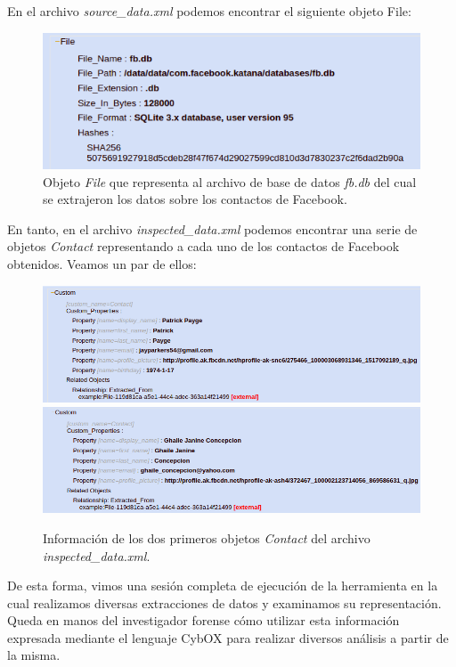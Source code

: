 En el archivo \emph{source\_data.xml} podemos encontrar el siguiente objeto File:
\newline

\begin{figure}[H]
    \begin{center}
        \includegraphics[width=\textwidth]{figures/FbDBFileObject}
        \caption{Objeto \emph{File} que representa al archivo de base de datos \emph{fb.db} del cual se extrajeron los datos sobre los contactos de Facebook.}
    \end{center}
\end{figure}

En tanto, en el archivo \emph{inspected\_data.xml} podemos encontrar una serie de objetos \emph{Contact} representando a cada uno de los contactos de Facebook obtenidos. Veamos un par de ellos:
\newline

\begin{figure}[H]
    \begin{center}
        \includegraphics[width=\textwidth]{figures/contact1}
        \includegraphics[width=\textwidth]{figures/contact2}
        \caption{Información de los dos primeros objetos \emph{Contact} del archivo \emph{inspected\_data.xml}.}
    \end{center}
\end{figure}

De esta forma, vimos una sesión completa de ejecución de la herramienta en la cual realizamos diversas extracciones de datos y examinamos su representación. Queda en manos del investigador forense cómo utilizar esta información expresada mediante el lenguaje CybOX para realizar diversos análisis a partir de la misma.